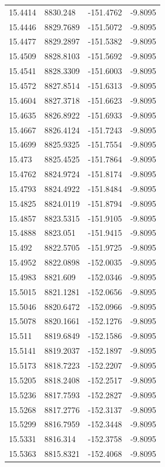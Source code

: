 \begin{table}[H]
\begin{tabular}{llll}
15.4414 & 8830.248 & -151.4762 & -9.8095 \\
15.4446 & 8829.7689 & -151.5072 & -9.8095 \\
15.4477 & 8829.2897 & -151.5382 & -9.8095 \\
15.4509 & 8828.8103 & -151.5692 & -9.8095 \\
15.4541 & 8828.3309 & -151.6003 & -9.8095 \\
15.4572 & 8827.8514 & -151.6313 & -9.8095 \\
15.4604 & 8827.3718 & -151.6623 & -9.8095 \\
15.4635 & 8826.8922 & -151.6933 & -9.8095 \\
15.4667 & 8826.4124 & -151.7243 & -9.8095 \\
15.4699 & 8825.9325 & -151.7554 & -9.8095 \\
15.473 & 8825.4525 & -151.7864 & -9.8095 \\
15.4762 & 8824.9724 & -151.8174 & -9.8095 \\
15.4793 & 8824.4922 & -151.8484 & -9.8095 \\
15.4825 & 8824.0119 & -151.8794 & -9.8095 \\
15.4857 & 8823.5315 & -151.9105 & -9.8095 \\
15.4888 & 8823.051 & -151.9415 & -9.8095 \\
15.492 & 8822.5705 & -151.9725 & -9.8095 \\
15.4952 & 8822.0898 & -152.0035 & -9.8095 \\
15.4983 & 8821.609 & -152.0346 & -9.8095 \\
15.5015 & 8821.1281 & -152.0656 & -9.8095 \\
15.5046 & 8820.6472 & -152.0966 & -9.8095 \\
15.5078 & 8820.1661 & -152.1276 & -9.8095 \\
15.511 & 8819.6849 & -152.1586 & -9.8095 \\
15.5141 & 8819.2037 & -152.1897 & -9.8095 \\
15.5173 & 8818.7223 & -152.2207 & -9.8095 \\
15.5205 & 8818.2408 & -152.2517 & -9.8095 \\
15.5236 & 8817.7593 & -152.2827 & -9.8095 \\
15.5268 & 8817.2776 & -152.3137 & -9.8095 \\
15.5299 & 8816.7959 & -152.3448 & -9.8095 \\
15.5331 & 8816.314 & -152.3758 & -9.8095 \\
15.5363 & 8815.8321 & -152.4068 & -9.8095 \\

\end{tabular}
\end{table}
